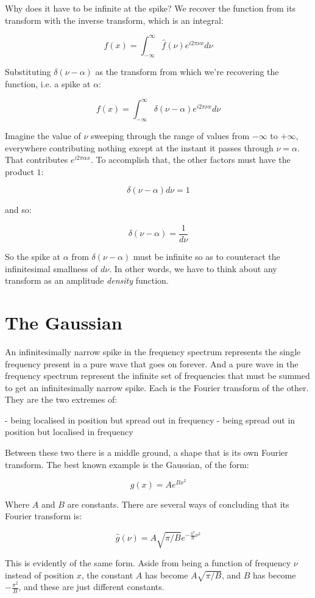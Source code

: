Why does it have to be infinite at the spike? We recover the function from its transform with the inverse transform, which is an integral:

$$
f(x) = \int_{-\infty}^{\infty} \hat{f}(\nu)e^{i2\pi\nu x} d\nu
$$

Substituting $\delta(\nu - \alpha)$ as the transform from which we're recovering the function, i.e. a spike at $\alpha$:

$$
f(x) = \int_{-\infty}^{\infty} \delta(\nu - \alpha)e^{i2\pi\nu x} d\nu
$$

Imagine the value of $\nu$ sweeping through the range of values from $-\infty$ to $+\infty$, everywhere contributing nothing except at the instant it passes through $\nu = \alpha$. That contributes $e^{i2\pi\alpha x}$. To accomplish that, the other factors must have the product $1$:

$$
\delta(\nu - \alpha) d\nu = 1
$$

and so:

$$
\delta(\nu - \alpha) = \frac{1}{d\nu}
$$

So the spike at $\alpha$ from $\delta(\nu - \alpha)$ must be infinite so as to counteract the infinitesimal smallness of $d\nu$. In other words, we have to think about any transform as an amplitude \textit{density} function.

\section{The Gaussian}

An infinitesimally narrow spike in the frequency spectrum represents the single frequency present in a pure wave that goes on forever. And a pure wave in the frequency spectrum represent the infinite set of frequencies that must be summed to get an infinitesimally narrow spike. Each is the Fourier transform of the other. They are the two extremes of:

- being localised in position but spread out in frequency
- being spread out in position but localised in frequency

Between these two there is a middle ground, a shape that is its own Fourier transform. The best known example is the Gaussian, of the form:

$$g(x) = Ae^{Bx^2}$$

Where $A$ and $B$ are constants. There are several ways of concluding that its Fourier transform is:

$$\hat{g}(\nu) = A \sqrt{\pi/B} e^{-\frac{\pi^2}{B} \nu^2}$$

This is evidently of the same form. Aside from being a function of frequency $\nu$ instead of position $x$, the constant $A$ has become $A \sqrt{\pi/B}$, and $B$ has become $-\frac{\pi^2}{B}$, and these are just different constants.
